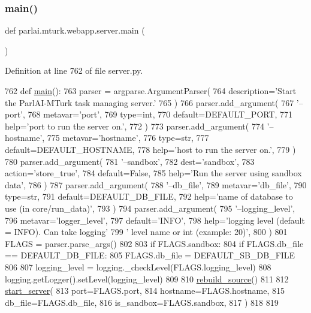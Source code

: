 \subsubsection{\texorpdfstring{main()}{main()}}
{\footnotesize\ttfamily def parlai.\+mturk.\+webapp.\+server.\+main (\begin{DoxyParamCaption}{ }\end{DoxyParamCaption})}



Definition at line 762 of file server.\+py.


\begin{DoxyCode}
762 \textcolor{keyword}{def }\hyperlink{namespaceparlai_1_1mturk_1_1webapp_1_1server_a1919be0d74781c0b9f579daf974d9f53}{main}():
763     parser = argparse.ArgumentParser(
764         description=\textcolor{stringliteral}{'Start the ParlAI-MTurk task managing server.'}
765     )
766     parser.add\_argument(
767         \textcolor{stringliteral}{'--port'},
768         metavar=\textcolor{stringliteral}{'port'},
769         type=int,
770         default=DEFAULT\_PORT,
771         help=\textcolor{stringliteral}{'port to run the server on.'},
772     )
773     parser.add\_argument(
774         \textcolor{stringliteral}{'--hostname'},
775         metavar=\textcolor{stringliteral}{'hostname'},
776         type=str,
777         default=DEFAULT\_HOSTNAME,
778         help=\textcolor{stringliteral}{'host to run the server on.'},
779     )
780     parser.add\_argument(
781         \textcolor{stringliteral}{'--sandbox'},
782         dest=\textcolor{stringliteral}{'sandbox'},
783         action=\textcolor{stringliteral}{'store\_true'},
784         default=\textcolor{keyword}{False},
785         help=\textcolor{stringliteral}{'Run the server using sandbox data'},
786     )
787     parser.add\_argument(
788         \textcolor{stringliteral}{'--db\_file'},
789         metavar=\textcolor{stringliteral}{'db\_file'},
790         type=str,
791         default=DEFAULT\_DB\_FILE,
792         help=\textcolor{stringliteral}{'name of database to use (in core/run\_data)'},
793     )
794     parser.add\_argument(
795         \textcolor{stringliteral}{'--logging\_level'},
796         metavar=\textcolor{stringliteral}{'logger\_level'},
797         default=\textcolor{stringliteral}{'INFO'},
798         help=\textcolor{stringliteral}{'logging level (default = INFO). Can take logging'}
799         \textcolor{stringliteral}{' level name or int (example: 20)'},
800     )
801     FLAGS = parser.parse\_args()
802 
803     \textcolor{keywordflow}{if} FLAGS.sandbox:
804         \textcolor{keywordflow}{if} FLAGS.db\_file == DEFAULT\_DB\_FILE:
805             FLAGS.db\_file = DEFAULT\_SB\_DB\_FILE
806 
807     logging\_level = logging.\_checkLevel(FLAGS.logging\_level)
808     logging.getLogger().setLevel(logging\_level)
809 
810     \hyperlink{namespaceparlai_1_1mturk_1_1webapp_1_1server_a0ce17c85e37b7734ab2fbaca711cb45f}{rebuild\_source}()
811 
812     \hyperlink{namespaceparlai_1_1mturk_1_1webapp_1_1server_a3faf7a84baf92a6b0863ab87a0015c41}{start\_server}(
813         port=FLAGS.port,
814         hostname=FLAGS.hostname,
815         db\_file=FLAGS.db\_file,
816         is\_sandbox=FLAGS.sandbox,
817     )
818 
819 
\end{DoxyCode}
